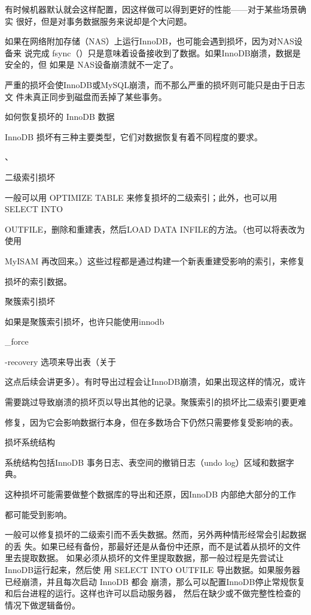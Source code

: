 有时候机器默认就会这样配置，因这样做可以得到更好的性能——对于某些场景确实
很好，但是对事务数据服务来说却是个大问题。

如果在网络附加存储（NAS）上运行InnoDB，也可能会遇到损坏，因为对NAS设备来
说完成 fsync（）只是意味着设备接收到了数据。如果InnoDB崩溃，数据是安全的，但
如果是 NAS设备崩溃就不一定了。

严重的损坏会使InnoDB或MySQL崩溃，而不那么严重的损坏则可能只是由于日志文
件未真正同步到磁盘而丢掉了某些事务。

如何恢复损坏的 InnoDB 数据

InnoDB 损坏有三种主要类型，它们对数据恢复有着不同程度的要求。

、

二级索引损坏

一般可以用 OPTIMIZE TABLE 来修复损坏的二级索引；此外，也可以用 SELECT INTO

OUTFILE，删除和重建表，然后LOAD DATA INFILE的方法。（也可以将表改为使用

MyISAM 再改回来。）这些过程都是通过构建一个新表重建受影响的索引，来修复

损坏的索引数据。

聚簇索引损坏

如果是聚簇索引损坏，也许只能使用innodb

\_force

-recovery 选项来导出表（关于

这点后续会讲更多）。有时导出过程会让InnoDB崩溃，如果出现这样的情况，或许

需要跳过导致崩溃的损坏页以导出其他的记录。聚簇索引的损坏比二级索引要更难

修复，因为它会影响数据行本身，但在多数场合下仍然只需要修复受影响的表。

损坏系统结构

系统结构包括InnoDB 事务日志、表空间的撤销日志（undo log）区域和数据字典。

这种损坏可能需要做整个数据库的导出和还原，因InnoDB 内部绝大部分的工作

都可能受到影响。

一般可以修复损坏的二级索引而不丢失数据。然而，另外两种情形经常会引起数据的丢
失。如果已经有备份，那最好还是从备份中还原，而不是试着从损坏的文件里去提取数据。
如果必须从损坏的文件里提取数据，那一般过程是先尝试让InnoDB运行起来，然后使
用 SELECT INTO OUTFILE 导出数据。如果服务器已经崩溃，并且每次启动 InnoDB 都会
崩溃，那么可以配置InnoDB停止常规恢复和后台进程的运行。这样也许可以启动服务器，
然后在缺少或不做完整性检查的情况下做逻辑备份。

